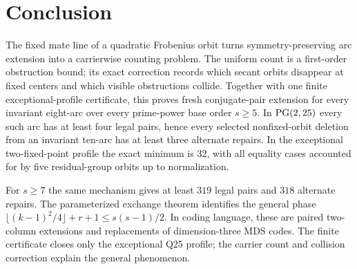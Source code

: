 \section{Conclusion}

The fixed mate line of a quadratic Frobenius orbit turns symmetry-preserving
arc extension into a carrierwise counting problem.  The uniform count is a
first-order obstruction bound; its exact correction records which secant
orbits disappear at fixed centers and which visible obstructions collide.
Together with one finite exceptional-profile certificate, this proves
fresh conjugate-pair extension for every invariant eight-arc over every
prime-power base order $s\ge5$.  In $\operatorname{PG}(2,25)$ every such arc has at least
four legal pairs, hence every selected nonfixed-orbit deletion from an
invariant ten-arc has at least three alternate repairs.  In the exceptional
two-fixed-point profile the exact minimum is $32$, with all equality cases
accounted for by five residual-group orbits up to normalization.

For $s\ge7$ the same mechanism gives at least $319$ legal pairs and $318$
alternate repairs.  The parameterized exchange theorem identifies the
general phase
$\lfloor(k-1)^2/4\rfloor+r+1\le s(s-1)/2$.  In coding language, these are
paired two-column extensions and replacements of dimension-three MDS
codes.  The finite certificate closes only the exceptional Q25 profile; the
carrier count and collision correction explain the general phenomenon.
